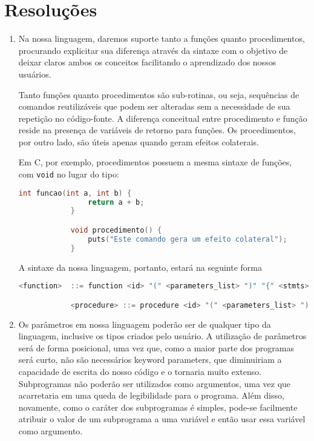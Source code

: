 \documentclass[12pt, a4paper]{article}
\begin{document}
\section{Resoluções}
    \begin{enumerate}
        \item
        Na nossa linguagem, daremos suporte tanto a funções quanto
        procedimentos, procurando explicitar sua diferença através da sintaxe
        com o objetivo de deixar claros ambos os conceitos facilitando o
        aprendizado dos nossos usuários.

        Tanto funções quanto procedimentos são sub-rotinas, ou seja, sequências
        de comandos reutilizáveis que podem ser alteradas sem a necessidade de
        sua repetição no código-fonte. A diferença conceitual entre
        procedimento e função reside na presença de variáveis de retorno para
        funções. Os procedimentos, por outro lado, são úteis apenas quando
        geram efeitos colaterais.

        Em C, por exemplo, procedimentos possuem a mesma sintaxe de funções,
        com \texttt{void} no lugar do tipo:

        \begin{lstlisting}[language=C]
            int funcao(int a, int b) {
                return a + b;
            }

            void procedimento() {
                puts("Este comando gera um efeito colateral");
            }
        \end{lstlisting}

        A sintaxe da nossa linguagem, portanto, estará na seguinte forma

        \begin{lstlisting}[language=C]
            <function>  ::= function <id> "(" <parameters_list> ")" "{" <stmts> <return_stmt> "}"

            <procedure> ::= procedure <id> "(" <parameters_list> ")" "{" <stmts> "}"
        \end{lstlisting}

        \item
        Os parâmetros em nossa linguagem poderão ser de qualquer tipo da
        linguagem, inclusive os tipos criados pelo usuário. A utilização de
        parâmetros será de forma posicional, uma vez que, como a maior parte
        dos programas será curto, não são necessários keyword parameters, que
        diminuiriam a capacidade de escrita do nosso código e o tornaria muito
        extenso. Subprogramas não poderão ser utilizados como argumentos, uma
        vez que acarretaria em uma queda de legibilidade para o programa. Além
        disso, novamente, como o caráter dos subprogramas é simples, pode-se
        facilmente atribuir o valor de um subprograma a uma variável e então
        usar essa variável como argumento.


\end{enumerate}
\end{document}

